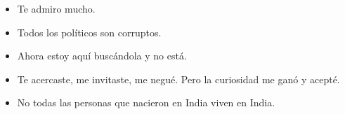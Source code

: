 \documentclass[oneside]{style}
\begin{document}
\begin{questions}[label=\protect\circled{\bfseries\arabic*}]
{        \begin{itemize}
            \item Te admiro mucho. 
            \item Todos los políticos son corruptos. 
            \item Ahora estoy aquí buscándola y no está. 
            \item Te acercaste, me invitaste, me negué. Pero la curiosidad 
            me ganó y acepté. 
            \item No todas las personas que nacieron en India viven en India. 
        \end{itemize}
    }
\end{questions}
\end{document}
